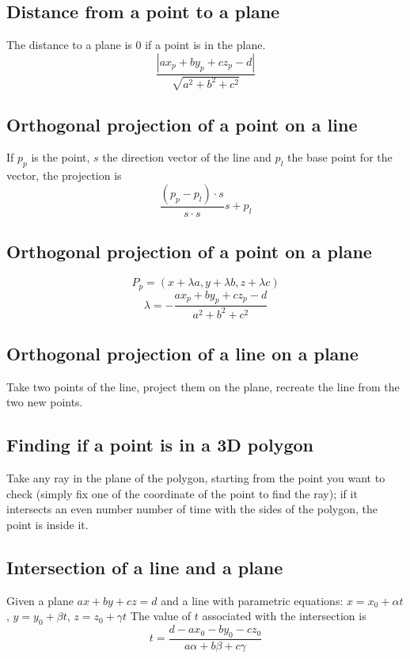 \subsection{Distance from a point to a plane}
The distance to a plane is 0 if a point is in the plane.
$$\frac{|ax_p+by_p+cz_p-d|}{\sqrt{a^2+b^2+c^2}}$$

\subsection{Orthogonal projection of a point on a line}
If $p_p$ is the point, $s$ the direction vector of the line and $p_l$ the base point for the vector, the projection is
$$\frac{(p_p-p_l)\cdot s}{s\cdot s}s+p_l$$

\subsection{Orthogonal projection of a point on a plane}
$$P_p=(x+\lambda a, y+\lambda b, z + \lambda c)$$
$$\lambda = -\frac{ax_p+by_p+cz_p-d}{a^2+b^2+c^2}$$

\subsection{Orthogonal projection of a line on a plane}
Take two points of the line, project them on the plane, recreate the line from the two new points.

\subsection{Finding if a point is in a 3D polygon}
Take any ray in the plane of the polygon, starting from the point you want to check (simply fix one of the coordinate of the point to find the ray); if it intersects an even number number of time with the sides of the polygon, the point is inside it.

\subsection{Intersection of a line and a plane}
Given a plane $ax+by+cz=d$ and a line with parametric equations:
$x=x_0+\alpha t$, $y=y_0+\beta t$, $z=z_0+\gamma t$
The value of $t$ associated with the intersection is
$$t=\frac{d-ax_0-by_0-cz_0}{a\alpha+b\beta+c\gamma}$$
